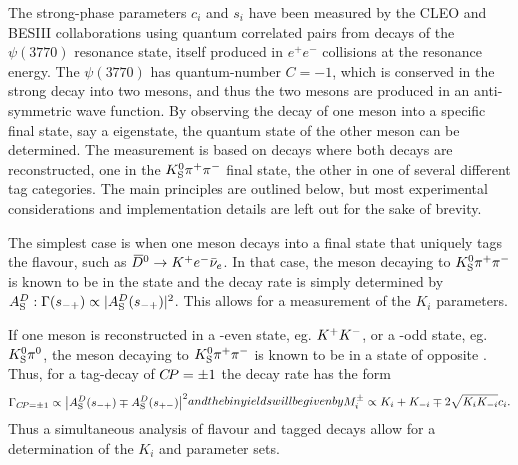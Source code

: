 The strong-phase parameters $c_i$ and $s_i$ have been measured by the CLEO and BESIII collaborations using quantum correlated \Dz\Dzb pairs from decays of the $\psi(3770)$ resonance state, itself produced in $e^+e^-$ collisions at the resonance energy. The $\psi(3770)$ has quantum-number $C=-1$, which is conserved in the strong decay into two \D mesons, and thus the two \D mesons are produced in an anti-symmetric wave function. By observing the decay of one \D meson into a specific final state, say a \CP eigenstate, the quantum state of the other \D meson can be determined. The measurement is based on decays where both \D decays are reconstructed, one in the ${{K}^0_{\mathrm{S}}}{{\pi}^+}{{\pi}^-}$ final state, the other in one of several different tag categories. The main principles are outlined below, but most experimental considerations and implementation details are left out for the sake of brevity.

The simplest case is when one \D meson decays into a final state that uniquely tags the flavour, such as ${{\kern 0.18em\overline{\kern -0.18em D}}{}^0}\rightarrow{\ensuremath{{K}^+}} e^-\bar\nu_e$. In that case, the \D meson decaying to ${{K}^0_{\mathrm{S}}}{{\pi}^+}{{\pi}^-}$ is known to be in the \Dz state and the decay rate is simply determined by $A_{\rm S}^{D}: \Gamma(s_{-+})\propto |A_{\rm S}^{D}(s_{-+})|^2$. This allows for a measurement of the $K_i$ parameters.

If one \D meson is reconstructed in a \CP-even state, eg. ${{K}^+}{{K}^-}$, or a \CP-odd state, eg. ${{K}^0_{\mathrm{S}}}{{\pi}^0}$, the \D meson decaying to ${{K}^0_{\mathrm{S}}}{{\pi}^+}{{\pi}^-}$ is known to be in a state of opposite \CP. Thus, for a tag-decay of ${C\!P}=\pm1$ the decay rate has the form
\begin{subequations}
\label{eq:CP_cisi}
\begin{align}
    \Gamma_{\CP=\pm1} \propto \left| \ADS(\smp) \mp \ADS(\spm)\right|^2
\end{align}
and the bin yields will be given by
\begin{align}
    M_i^\pm \propto K_i + K_{-i} \mp 2 \sqrt{K_i K_{-i}}c_i.
\end{align}
\end{subequations}
Thus a simultaneous analysis of flavour and \CP tagged decays allow for a determination of the $K_i$ and \ci parameter sets.

